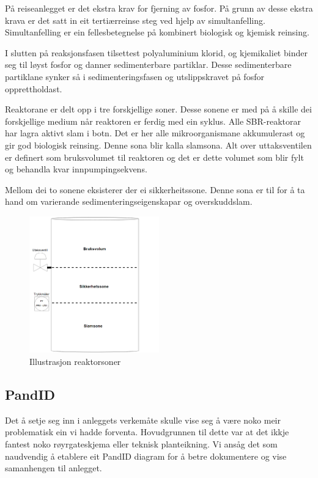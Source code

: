 På reiseanlegget er det ekstra krav for fjerning av fosfor. På grunn av desse ekstra krava
er det satt in eit tertiærreinse steg ved hjelp av simultanfelling.
Simultanfelling er ein fellesbetegnelse på kombinert biologisk og kjemisk reinsing.

I slutten på reaksjonsfasen tilsettest polyaluminium klorid, og kjemikaliet binder seg til
løyst fosfor og danner sedimenterbare partiklar. Desse sedimenterbare partiklane synker 
så i sedimenteringsfasen og utslippskravet på fosfor opprettholdast.


\newpage

Reaktorane er delt opp i tre forskjellige soner. Desse sonene er med på å skille
dei forskjellige medium når reaktoren er ferdig med ein syklus.
Alle SBR-reaktorar har lagra aktivt slam i botn. Det er her alle mikroorganismane akkumulerast
og gir god biologisk reinsing. Denne sona blir kalla slamsona.\newline
Alt over uttaksventilen er definert som bruksvolumet til reaktoren og det
er dette volumet som blir fylt og behandla kvar innpumpingsekvens.

Mellom dei to sonene eksisterer der ei sikkerheitssone.
Denne sona er til for å ta hand om varierande sedimenteringseigenskapar
og overskuddslam. \newline

\begin{figure}[htbp]
    \centering
    \includegraphics[width=0.5\textwidth]{Figurar/Reaktorsoner.png}
    \caption{Illustrasjon reaktorsoner}\label{fig:reaktorsoner}
\end{figure}

\subsection{PandID}

Det å setje seg inn i anleggets verkemåte skulle vise seg å være noko meir problematisk ein vi hadde forventa.
Hovudgrunnen til dette var at det ikkje fantest noko røyrgateskjema eller teknisk planteikning.
Vi ansåg det som naudvendig å etablere eit PandID diagram for å betre dokumentere og vise samanhengen til anlegget.

